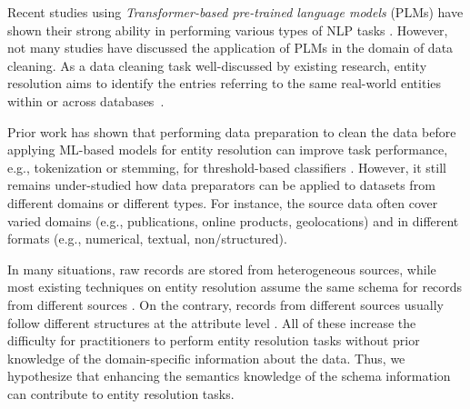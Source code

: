 Recent studies using \emph{Transformer-based pre-trained language models} (PLMs) have shown their strong ability in performing various types of NLP tasks \cite{min_recent_2021}. However, not many studies have discussed the application of PLMs in the domain of data cleaning. As a data cleaning task well-discussed by existing research, entity resolution aims to identify the entries referring to the same real-world entities within or across databases~\cite{christen_data_2012}. 




Prior work has shown that performing data preparation to clean the data before applying ML-based models for entity resolution can improve task performance,  e.g., tokenization or stemming, for threshold-based classifiers \cite{koumarelas_data_2020}. However, it still remains under-studied how data preparators can be applied to datasets from different domains or different types. For instance, the source data often cover varied domains (e.g., publications, online products, geolocations) and in different formats (e.g., numerical, textual, non/structured). 

In many situations, raw records are stored from heterogeneous sources, while most existing techniques on entity resolution assume the same schema for records from different sources \cite{elmagarmid_duplicate_2007}. On the contrary, records from different sources usually follow different structures at the attribute level \cite{enriquez_entity_2017, arabnia_when_2021}. 
All of these increase the difficulty for practitioners to perform entity resolution tasks without prior knowledge of the domain-specific information about the data.
Thus, we hypothesize that enhancing the semantics knowledge of the schema information can contribute to entity resolution tasks.  

